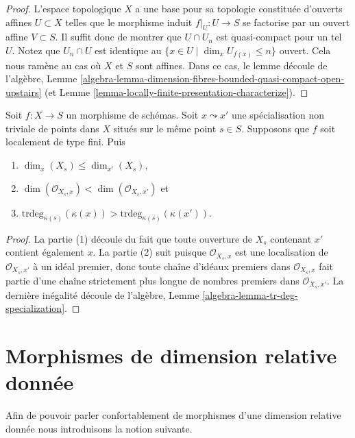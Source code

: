 \begin{proof}
L'espace topologique $X$ a une base pour sa topologie
constituée d'ouverts affines $U \subset X$
telles que le morphisme induit $f|_U : U \to S$ se factorise
par un ouvert affine $V \subset S$. Il suffit donc de montrer
que $U \cap U_n$ est quasi-compact pour
un tel $U$. Notez que $U_n \cap U$ est identique
au $\{x \in U \mid \dim_x U_{f(x)} \leq n\}$ ouvert. Cela nous ramène au cas où $X$
et
$S$ sont affines. Dans ce cas, le lemme découle de
l'algèbre, Lemme \ref{algebra-lemma-dimension-fibres-bounded-quasi-compact-open-upstairs} (et Lemme \ref{lemma-locally-finite-presentation-characterize}).
\end{proof}

\begin{lemma}
\label{lemma-dimension-fibre-specialization}
Soit $f : X \to S$ un morphisme de schémas. Soit $x \leadsto x'$
une spécialisation non triviale de points dans $X$ situés sur
le même point $s \in S$. Supposons que $f$ soit localement de type fini.
Puis
\begin{enumerate}
\item $\dim_x(X_s) \leq \dim_{x'}(X_s)$,
\item $\dim(\mathcal{O}_{X_s, x}) < \dim(\mathcal{O}_{X_s, x'})$ et
\item $\text{trdeg}_{\kappa(s)}(\kappa(x)) >
\text{trdeg}_{\kappa(s)}(\kappa(x'))$.
\end{enumerate}
\end{lemma}

\begin{proof}
La partie (1) découle du fait que toute ouverture de $X_s$ contenant
$x'$ contient également $x$. La partie (2) suit puisque
$\mathcal{O}_{X_s, x}$ est une localisation de $\mathcal{O}_{X_s, x'}$ à un idéal premier,
donc toute chaîne d'idéaux premiers dans $\mathcal{O}_{X_s, x}$ fait partie d'une
chaîne strictement plus longue de nombres premiers dans $\mathcal{O}_{X_s, x'}$. La dernière
inégalité découle de l'algèbre, Lemme \ref{algebra-lemma-tr-deg-specialization}.
\end{proof}






\section{Morphismes de dimension relative donnée}
\label{section-relative-dimension}

\noindent
Afin de pouvoir parler confortablement de morphismes d'une dimension
relative donnée nous introduisons la notion suivante.

